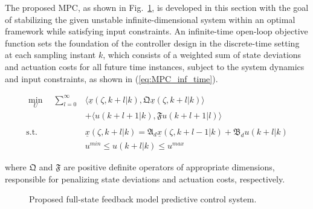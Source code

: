 The proposed MPC, as shown in Fig.~\ref{fig:block_diagram}, is developed in this section with the goal of stabilizing the given unstable infinite-dimensional system within an optimal framework while satisfying input constraints. An infinite-time open-loop objective function sets the foundation of the controller design in the discrete-time setting at each sampling instant $k$, which consists of a weighted sum of state deviations and actuation costs for all future time instances, subject to the system dynamics and input constraints, as shown in (\ref{eq:MPC_inf_time}).

\begin{equation} \label{eq:MPC_inf_time}
    \begin{aligned}
        \min_{U} \quad \sum_{l=0}^{\infty} &\langle \underline{x}(\zeta, k+l | k), \mathfrak{Q} \underline{x}(\zeta, k+l | k) \rangle \\
        &+ \langle u(k+l+1 | k), \mathfrak{F} u(k+l+1|l) \rangle \\
        \, \\
        \text{s.t.} \quad &\underline{x}(\zeta, k+l | k) = \mathfrak{A}_d \underline{x}(\zeta, k+l-1 | k) + \mathfrak{B}_d u(k+l | k) \\
        &u^{min} \leq u(k+l | k) \leq u^{max}
    \end{aligned}
\end{equation}

where $\mathfrak{Q}$ and $\mathfrak{F}$ are positive definite operators of appropriate dimensions, responsible for penalizing state deviations and actuation costs, respectively. 

\begin{figure}[!htbp]
    \centering
    \caption{Proposed full-state feedback model predictive control system.}
    \label{fig:block_diagram}
\end{figure}